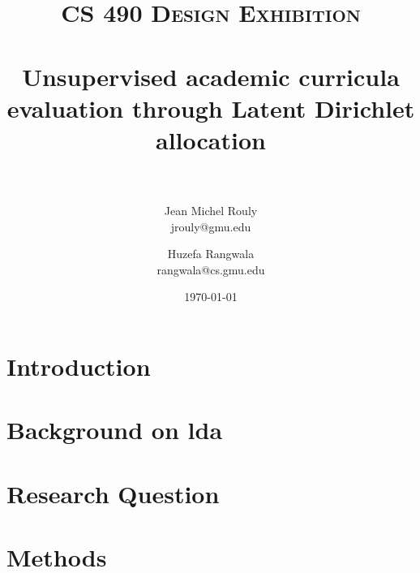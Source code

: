 \documentclass[paper=a4, fontsize=11pt]{scrartcl} %
\title{\normalfont\normalsize
\textsc{CS 490 Design Exhibition} \\ [25pt] %
\horrule{0.5pt} \\[0.4cm] %
\huge Unsupervised academic curricula evaluation through Latent Dirichlet
allocation \\ %
\horrule{2pt} \\[0.5cm] %
}
\author{Jean Michel Rouly \\ jrouly@gmu.edu \and Huzefa Rangwala \\ rangwala@cs.gmu.edu} %
\date{\normalsize\today} %
\numberwithin{equation}{section} %
\numberwithin{figure}{section} %
\numberwithin{table}{section} %
\begin{document}
\maketitle %









\section{Introduction}





\section{Background on \acf{lda}}





\section{Research Question}





\section{Methods}

\end{document}
